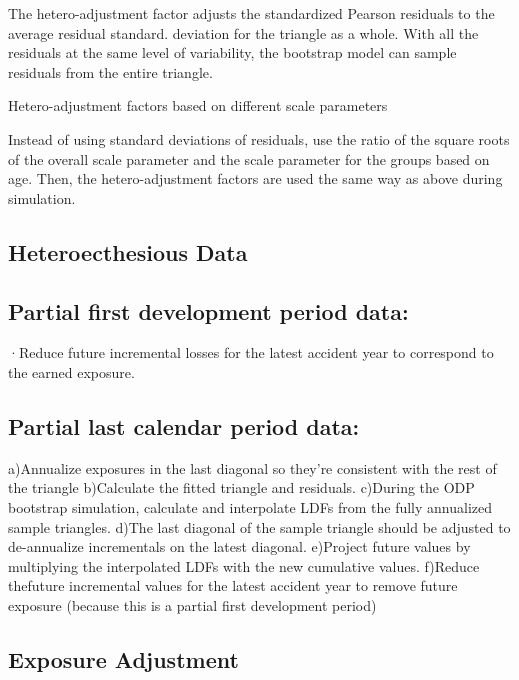 \documentclass[
]{article}
\begin{document}
The hetero-adjustment factor adjusts the standardized Pearson residuals
to the average residual standard. deviation for the triangle as a whole.
With all the residuals at the same level of variability, the bootstrap
model can sample residuals from the entire triangle.

Hetero-adjustment factors based on different scale parameters

Instead of using standard deviations of residuals, use the ratio of the
square roots of the overall scale parameter and the scale parameter for
the groups based on age. Then, the hetero-adjustment factors are used
the same way as above during simulation.

\subsection{Heteroecthesious Data}\label{heteroecthesious-data}

\subsection{Partial first development period
data:}\label{partial-first-development-period-data}

·Reduce future incremental losses for the latest accident year to
correspond to the earned exposure.

\subsection{Partial last calendar period
data:}\label{partial-last-calendar-period-data}

a)Annualize exposures in the last diagonal so they're consistent with
the rest of the triangle b)Calculate the fitted triangle and residuals.
c)During the ODP bootstrap simulation, calculate and interpolate LDFs
from the fully annualized sample triangles. d)The last diagonal of the
sample triangle should be adjusted to de-annualize incrementals on the
latest diagonal. e)Project future values by multiplying the interpolated
LDFs with the new cumulative values. f)Reduce thefuture incremental
values for the latest accident year to remove future exposure (because
this is a partial first development period)

\subsection{Exposure Adjustment}\label{exposure-adjustment}
\end{document}
